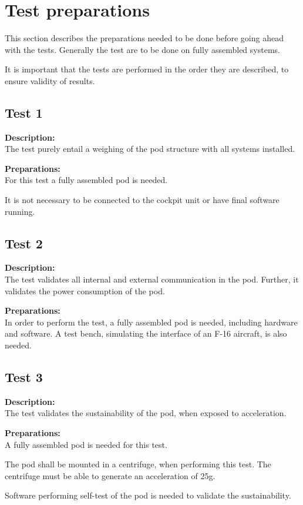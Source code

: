 \documentclass[Main]{subfiles}
\begin{document}
\setcounter{chapter}{2}
\chapter{Test preparations}
This section describes the preparations needed to be done before going ahead with the tests.
Generally the test are to be done on fully assembled systems.

It is important that the tests are performed in the order they are described, to ensure validity of results.

\section{Test 1}
\textbf{Description: }\\
The test purely entail a weighing of the pod structure with all systems installed.

\textbf{Preparations: }\\
For this test a fully assembled pod is needed. 

It is not necessary to be connected to the cockpit unit or have final software running.

\section{Test 2}
\textbf{Description: }\\
The test validates all internal and external communication in the pod. Further, it validates the power consumption of the pod.

\textbf{Preparations: }\\
In order to perform the test, a fully assembled pod is needed, including hardware and software. A test bench, simulating the interface of an F-16 aircraft, is also needed.

\newpage
\section{Test 3}
\textbf{Description: }\\
The test validates the sustainability of the pod, when exposed to acceleration.

\textbf{Preparations: }\\
A fully assembled pod is needed for this test. 

The pod shall be mounted in a centrifuge, when performing this test.
The centrifuge must be able to generate an acceleration of 25g.

Software performing self-test of the pod is needed to validate the sustainability.
\end{document}
